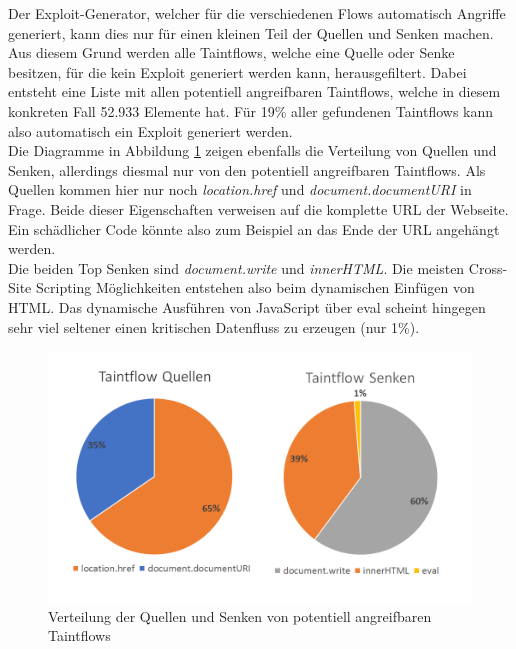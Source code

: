 Der Exploit-Generator, welcher für die verschiedenen Flows automatisch Angriffe generiert, kann dies nur für einen kleinen Teil der Quellen und Senken machen. Aus diesem Grund werden alle Taintflows, welche eine Quelle oder Senke besitzen, für die kein Exploit generiert werden kann, herausgefiltert. Dabei entsteht eine Liste mit allen potentiell angreifbaren Taintflows, welche in diesem konkreten Fall 52.933 Elemente hat. Für 19\% aller gefundenen Taintflows kann also automatisch ein Exploit generiert werden. \\
Die Diagramme in Abbildung \ref{fig:VerteilungQuellenSenkenAngreifbar} zeigen ebenfalls die Verteilung von Quellen und Senken, allerdings diesmal nur von den potentiell angreifbaren Taintflows. Als Quellen kommen hier nur noch \textit{location.href} und \textit{document.documentURI} in Frage. Beide dieser Eigenschaften verweisen auf die komplette URL der Webseite. Ein schädlicher Code könnte also zum Beispiel an das Ende der URL angehängt werden. \\
Die beiden Top Senken sind \textit{document.write} und \textit{innerHTML}. Die meisten Cross-Site Scripting Möglichkeiten entstehen also beim dynamischen Einfügen von HTML. Das dynamische Ausführen von JavaScript über eval scheint hingegen sehr viel seltener einen kritischen Datenfluss zu erzeugen (nur 1\%). 

\begin{figure}[h]
	\centering
	\hspace*{-1.2cm}
	\vspace*{-1.2cm}
	\includegraphics[width=1.2\textwidth]{Bilder/Diagram2.png}
	\caption{Verteilung der Quellen und Senken von potentiell angreifbaren Taintflows}
	\label{fig:VerteilungQuellenSenkenAngreifbar}
\end{figure}

